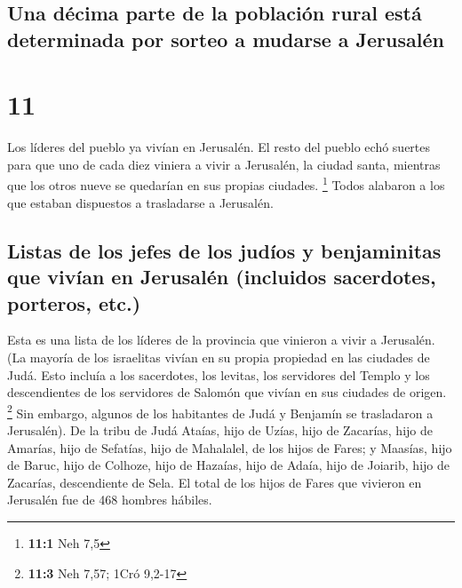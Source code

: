 \hypertarget{una-duxe9cima-parte-de-la-poblaciuxf3n-rural-estuxe1-determinada-por-sorteo-a-mudarse-a-jerusaluxe9n}{%
\subsection{Una décima parte de la población rural está determinada por
sorteo a mudarse a
Jerusalén}\label{una-duxe9cima-parte-de-la-poblaciuxf3n-rural-estuxe1-determinada-por-sorteo-a-mudarse-a-jerusaluxe9n}}

\hypertarget{section-10}{%
\section{11}\label{section-10}}

 Los líderes del pueblo ya vivían en Jerusalén. El resto
del pueblo echó suertes para que uno de cada diez viniera a vivir a
Jerusalén, la ciudad santa, mientras que los otros nueve se quedarían en
sus propias ciudades. \footnote{\textbf{11:1} Neh 7,5} 
Todos alabaron a los que estaban dispuestos a trasladarse a Jerusalén.

\hypertarget{listas-de-los-jefes-de-los-juduxedos-y-benjaminitas-que-vivuxedan-en-jerusaluxe9n-incluidos-sacerdotes-porteros-etc.}{%
\subsection{Listas de los jefes de los judíos y benjaminitas que vivían
en Jerusalén (incluidos sacerdotes, porteros,
etc.)}\label{listas-de-los-jefes-de-los-juduxedos-y-benjaminitas-que-vivuxedan-en-jerusaluxe9n-incluidos-sacerdotes-porteros-etc.}}

 Esta es una lista de los líderes de la provincia que
vinieron a vivir a Jerusalén. (La mayoría de los israelitas vivían en su
propia propiedad en las ciudades de Judá. Esto incluía a los sacerdotes,
los levitas, los servidores del Templo y los descendientes de los
servidores de Salomón que vivían en sus ciudades de origen. \footnote{\textbf{11:3}
  Neh 7,57; 1Cró 9,2-17}  Sin embargo, algunos de los
habitantes de Judá y Benjamín se trasladaron a Jerusalén). De la tribu
de Judá Ataías, hijo de Uzías, hijo de Zacarías, hijo de Amarías, hijo
de Sefatías, hijo de Mahalalel, de los hijos de Fares;  y
Maasías, hijo de Baruc, hijo de Colhoze, hijo de Hazaías, hijo de Adaía,
hijo de Joiarib, hijo de Zacarías, descendiente de Sela. 
El total de los hijos de Fares que vivieron en Jerusalén fue de 468
hombres hábiles.

